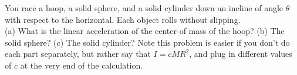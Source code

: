 You race a hoop, a solid sphere, and a solid cylinder down
an incline of angle $\theta$ with respect to the horizontal. Each
object rolls without slipping.\\
%
(a) What is the linear acceleration of the center of mass of the
hoop?\answercheck\hwendpart
%
(b) The solid sphere?\answercheck\hwendpart
%
(c) The solid cylinder?\answercheck
%
\noindent Note this problem is easier if you don't do each part
separately, but rather say that $I = c MR^2$, and plug in different
values of $c$ at the very end of the calculation.
